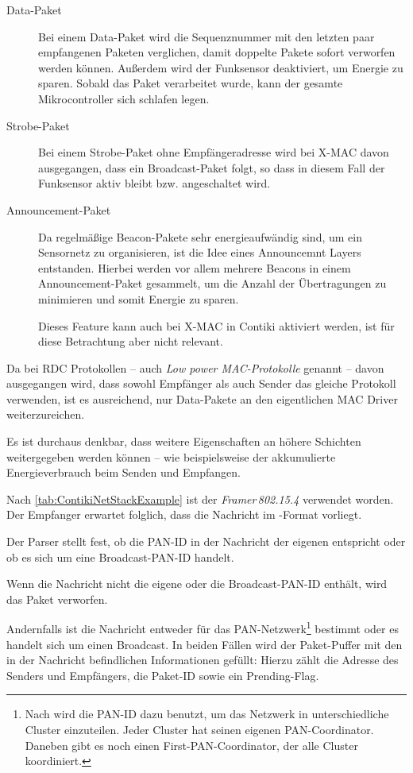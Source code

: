 	\begin{description}
	\item[Data-Paket]
		Bei einem Data-Paket wird die Sequenznummer mit den letzten
		paar empfangenen Paketen verglichen, damit doppelte Pakete
		sofort verworfen werden können. Außerdem wird der Funksensor
		deaktiviert, um Energie zu sparen.  Sobald das Paket
		verarbeitet wurde, kann der gesamte Mikrocontroller sich
		schlafen legen.

	\item[Strobe-Paket]
		Bei einem Strobe-Paket ohne Empfängeradresse wird bei X-MAC
		davon ausgegangen, dass ein Broadcast-Paket folgt, so dass in
		diesem Fall der Funksensor aktiv bleibt bzw. angeschaltet wird.

	\item[Announcement-Paket]
		Da regelmäßige Beacon-Pakete sehr energieaufwändig sind, um ein
		Sensornetz zu organisieren, ist die Idee eines Announcemnt
		Layers \autocite{dunkels11announcement} entstanden.  Hierbei
		werden vor allem mehrere Beacons in einem Announcement-Paket
		gesammelt, um die Anzahl der Übertragungen zu minimieren und
		somit Energie zu sparen.

		Dieses Feature kann auch bei X-MAC in Contiki aktiviert werden,
		ist für diese Betrachtung aber nicht relevant.
	\end{description}

	Da bei RDC Protokollen -- auch \emph{Low power MAC-Protokolle}
	genannt -- \idR davon ausgegangen wird, dass sowohl Empfänger
	als auch Sender das gleiche Protokoll verwenden, ist es
	ausreichend, nur Data-Pakete an den eigentlichen MAC Driver
	weiterzureichen.

	Es ist durchaus denkbar, dass weitere Eigenschaften an höhere
	Schichten weitergegeben werden können -- wie beispielsweise der
	akkumulierte Energieverbrauch beim Senden und Empfangen.


	Nach \autoref{tab:ContikiNetStackExample} ist der
	\emph{Framer\,802.15.4} verwendet worden.  Der Empfanger erwartet
	folglich, dass die Nachricht im \ieeeframe-Format vorliegt.

	Der Parser stellt fest, ob die PAN-ID in der Nachricht der eigenen
	entspricht oder ob es sich um eine Broadcast-PAN-ID handelt.

	Wenn die Nachricht nicht die eigene oder die Broadcast-PAN-ID enthält,
	wird das Paket verworfen.

	Andernfalls ist die Nachricht entweder für das
	PAN-Netzwerk\footnote{Nach \ieeeframe{} wird die PAN-ID dazu benutzt,
	um das Netzwerk in unterschiedliche Cluster einzuteilen.  Jeder Cluster
	hat seinen eigenen PAN-Coordinator. Daneben gibt es noch einen
	First-PAN-Coordinator, der alle Cluster koordiniert.} bestimmt oder es
	handelt sich um einen Broadcast.  In beiden Fällen wird der
	Paket-Puffer mit den in der Nachricht befindlichen Informationen
	gefüllt: Hierzu zählt die Adresse des Senders und Empfängers, die
	Paket-ID sowie ein Prending-Flag.

